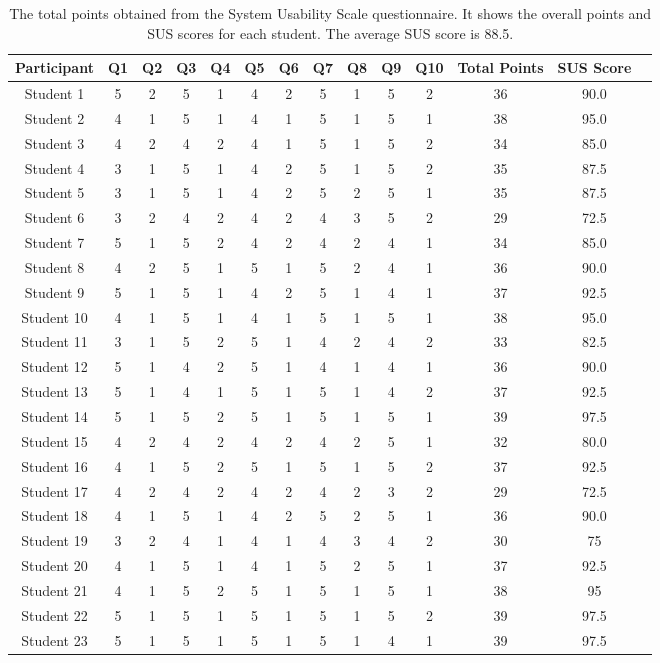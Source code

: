 \documentclass{l4proj}
\begin{document}
\begin{appendices}
\begin{table}[htbp]
  \centering
  \begin{tabular}{cccccccccccccc}
    \toprule
    Participant & Q1 & Q2 & Q3 & Q4 & Q5 & Q6 & Q7 & Q8 & Q9 & Q10 & Total Points & SUS Score \\
    \midrule
    Student 1 & 5 & 2 & 5 & 1 & 4 & 2 & 5 & 1 & 5 & 2 & 36 & 90.0 \\
    Student 2 & 4 & 1 & 5 & 1 & 4 & 1 & 5 & 1 & 5 & 1 & 38 & 95.0 \\
    Student 3 & 4 & 2 & 4 & 2 & 4 & 1 & 5 & 1 & 5 & 2 & 34 & 85.0 \\
    Student 4 & 3 & 1 & 5 & 1 & 4 & 2 & 5 & 1 & 5 & 2 & 35 & 87.5 \\
    Student 5 & 3 & 1 & 5 & 1 & 4 & 2 & 5 & 2 & 5 & 1 & 35 & 87.5 \\
    Student 6 & 3 & 2 & 4 & 2 & 4 & 2 & 4 & 3 & 5 & 2 & 29 & 72.5 \\
    Student 7 & 5 & 1 & 5 & 2 & 4 & 2 & 4 & 2 & 4 & 1 & 34 & 85.0 \\
    Student 8 & 4 & 2 & 5 & 1 & 5 & 1 & 5 & 2 & 4 & 1 & 36 & 90.0 \\
    Student 9 & 5 & 1 & 5 & 1 & 4 & 2 & 5 & 1 & 4 & 1 & 37 & 92.5 \\
    Student 10 & 4 & 1 & 5 & 1 & 4 & 1 & 5 & 1 & 5 & 1 & 38 & 95.0 \\
    Student 11 & 3 & 1 & 5 & 2 & 5 & 1 & 4 & 2 & 4 & 2 & 33 & 82.5 \\
    Student 12 & 5 & 1 & 4 & 2 & 5 & 1 & 4 & 1 & 4 & 1 & 36 & 90.0 \\
    Student 13 & 5 & 1 & 4 & 1 & 5 & 1 & 5 & 1 & 4 & 2 & 37 & 92.5 \\
    Student 14 & 5 & 1 & 5 & 2 & 5 & 1 & 5 & 1 & 5 & 1 & 39 & 97.5 \\
    Student 15 & 4 & 2 & 4 & 2 & 4 & 2 & 4 & 2 & 5 & 1 & 32 & 80.0 \\
    Student 16 & 4 & 1 & 5 & 2 & 5 & 1 & 5 & 1 & 5 & 2 & 37 & 92.5 \\
    Student 17 & 4 & 2 & 4 & 2 & 4 & 2 & 4 & 2 & 3 & 2 & 29 & 72.5 \\
    Student 18 & 4 & 1 & 5 & 1 & 4 & 2 & 5 & 2 & 5 & 1 & 36 & 90.0 \\
    Student 19 & 3 & 2 & 4 & 1 & 4 & 1 & 4 & 3 & 4 & 2 & 30 & 75 \\
    Student 20 & 4 & 1 & 5 & 1 & 4 & 1 & 5 & 2 & 5 & 1 & 37 & 92.5 \\
    Student 21 & 4 & 1 & 5 & 2 & 5 & 1 & 5 & 1 & 5 & 1 & 38 & 95 \\
    Student 22 & 5 & 1 & 5 & 1 & 5 & 1 & 5 & 1 & 5 & 2 & 39 & 97.5 \\
    Student 23 & 5 & 1 & 5 & 1 & 5 & 1 & 5 & 1 & 4 & 1 & 39 & 97.5 \\
    \bottomrule
  \end{tabular}


  \caption{The total points obtained from the System Usability Scale questionnaire. It shows the overall points and SUS scores for each student. The average SUS score is 88.5.}
  \label{tab:sus_results}
\end{table}



\end{appendices}
\end{document}
